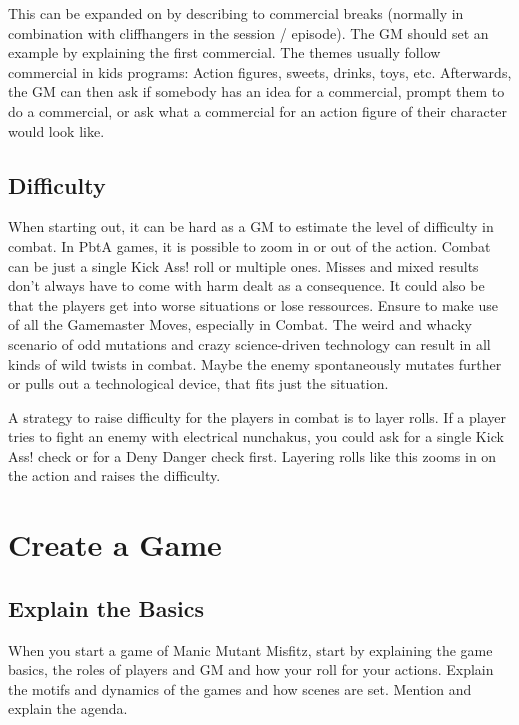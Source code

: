 \documentclass{book}
\begin{document}
This can be expanded on by describing to commercial breaks (normally in combination with cliffhangers in the session / episode). The GM should set an example by explaining the first commercial. The themes usually follow commercial in kids programs: Action figures, sweets, drinks, toys, etc. Afterwards, the GM can then ask if somebody has an idea for a commercial, prompt them to do a commercial, or ask what a commercial for an action figure of their character would look like.

\section*{Difficulty}
When starting out, it can be hard as a GM to estimate the level of difficulty in combat. In PbtA games, it is possible to zoom in or out of the action. Combat can be just a single Kick Ass! roll or multiple ones. Misses and mixed results don't always have to come with harm dealt as a consequence. It could also be that the players get into worse situations or lose ressources. Ensure to make use of all the Gamemaster Moves, especially in Combat. The weird and whacky scenario of odd mutations and crazy science-driven technology can result in all kinds of wild twists in combat. Maybe the enemy spontaneously mutates further or pulls out a technological device, that fits just the situation.

A strategy to raise difficulty for the players in combat is to layer rolls. If a player tries to fight an enemy with electrical nunchakus, you could ask for a single Kick Ass! check or for a Deny Danger check first. Layering rolls like this zooms in on the action and raises the difficulty.

\chapter*{Create a Game}
\section*{Explain the Basics}
When you start a game of Manic Mutant Misfitz, start by explaining the game basics, the roles of players and GM and how your roll for your actions.
Explain the motifs and dynamics of the games and how scenes are set.
Mention and explain the agenda.
\end{document}
